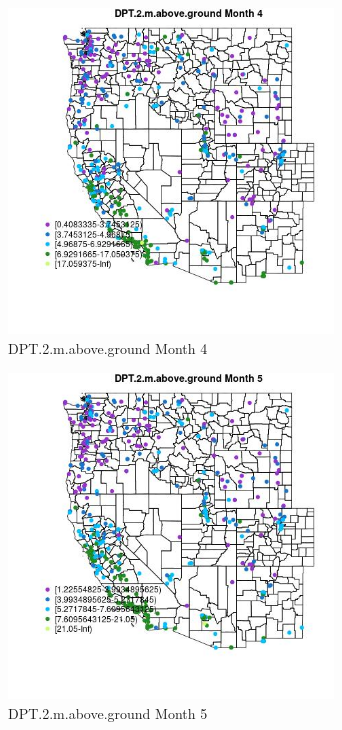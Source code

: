 \clearpage 

\begin{figure} 
\centering  
\includegraphics[width=0.77\textwidth]{Code_Outputs/ML_input_report_ML_input_PM25_Step5_part_d_de_duplicated_aves_ML_input_MapObsMo4DPT2maboveground.jpg} 
\caption{\label{fig:ML_input_report_ML_input_PM25_Step5_part_d_de_duplicated_aves_ML_inputMapObsMo4DPT2maboveground}DPT.2.m.above.ground Month 4} 
\end{figure} 
 

\begin{figure} 
\centering  
\includegraphics[width=0.77\textwidth]{Code_Outputs/ML_input_report_ML_input_PM25_Step5_part_d_de_duplicated_aves_ML_input_MapObsMo5DPT2maboveground.jpg} 
\caption{\label{fig:ML_input_report_ML_input_PM25_Step5_part_d_de_duplicated_aves_ML_inputMapObsMo5DPT2maboveground}DPT.2.m.above.ground Month 5} 
\end{figure} 
 


